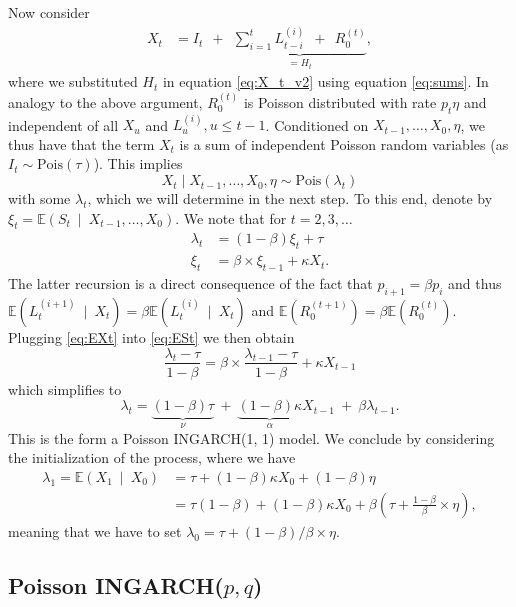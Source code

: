 \documentclass{article}
\begin{document}
Now consider %
\begin{align}
X_t & = I_t \ \ + \ \ \underbrace{\sum_{i = 1}^{t} L_{t - i}^{(i)} \ \ + \ \ R_0^{(t)}}_{= H_t}, \label{eq:introduce_N_T}
\end{align}
where we substituted $H_t$ in equation \eqref{eq:X_t_v2} using equation \eqref{eq:sums}. In analogy to the above argument, $R_0^{(t)}$ is Poisson distributed with rate $p_t\eta$ and independent of all $X_u$ and $L_u^{(i)}, u \leq t - 1$. Conditioned on $X_{t - 1}, \dots, X_0, \eta$, we thus have that the term $X_t$ is a sum of independent Poisson random variables (as $I_t \sim \text{Pois}(\tau)$). This implies
$$
X_t \mid X_{t - 1}, \dots, X_0, \eta \sim \text{Pois}(\lambda_t)
$$
with some $\lambda_t$, which we will determine in the next step. To this end, denote by $\xi_{t} = \mathbb{E}(S_t  \ \mid \ X_{t - 1}, \dots, X_0)$. We note that for $t = 2, 3, \dots$
\begin{align}
\lambda_t & = (1 - \beta)\xi_t + \tau
\label{eq:EXt}\\
\xi_t & = \beta \times \xi_{t - 1} + \kappa X_t.
\label{eq:ESt}
\end{align}
The latter recursion is a direct consequence of the fact that $p_{i + 1} = \beta p_i$ and thus $\mathbb{E}(L^{(i + 1)}_t \ \mid \ X_t) = \beta\mathbb{E}(L^{(i)}_t \ \mid \ X_t)$ and $\mathbb{E}(R^{(t + 1)}_0) = \beta\mathbb{E}(R^{(t)}_0)$. Plugging \eqref{eq:EXt} into \eqref{eq:ESt} we then obtain
$$
\frac{\lambda_t - \tau}{1 - \beta} = \beta \times \frac{\lambda_{t - 1} - \tau}{1 - \beta} + \kappa X_{t - 1}
$$
which simplifies to
$$
\lambda_t = \underbrace{(1 - \beta)\tau}_{\nu} \ + \ \underbrace{(1 - \beta)\kappa}_{\alpha} X_{t - 1} \ + \ \beta \lambda_{t - 1}.
$$
This is the form a Poisson INGARCH(1, 1) model. We conclude by considering the initialization of the process, where we have
\begin{align*}
\lambda_1 = \mathbb{E}(X_1 \ \mid \ X_0) & = \tau + (1 - \beta)\kappa X_0 + (1 - \beta)\eta\\ %
& =  \tau (1 - \beta) + (1 - \beta)\kappa X_0 + \beta  \left(\tau + \frac{1 - \beta}{\beta} \times \eta \right),
\end{align*}
meaning that we have to set $\lambda_0 =\tau + (1 - \beta)/\beta \times \eta$.

\subsection{Poisson INGARCH($p, q$)}
\end{document}
